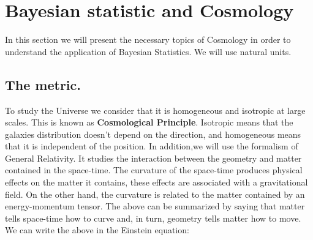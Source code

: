 \documentclass[onecolumn,           %
               showpacs,            %
               preprintnumbers,     %
               aps,                 %
               prl,          	    %
               letterpaper,             %
               superscriptaddress,      %
               nofootinbib,         %
               tightenlines,        %
               floats,floatfix      %
               ,usenatbib,
               ]{revtex4-1}
\begin{document}
\section{Bayesian statistic and Cosmology}



In this section we will present the necessary topics of Cosmology in order to understand the application of Bayesian Statistics. We will use natural units.

\subsection{The metric.}
To study the Universe we consider that it is homogeneous and isotropic at large scales. This is known as \textbf{Cosmological Principle}. Isotropic means that the galaxies distribution doesn't depend on the direction, and homogeneous means that it is independent of the position. In addition,we will use the formalism of General Relativity. It studies the interaction between the geometry and matter contained in the space-time. The curvature of the space-time produces physical effects on the matter it contains, these effects are associated with a gravitational field. On the other hand, the curvature is related to the matter contained by an energy-momentum tensor. The above can be summarized by saying that matter tells space-time how to curve and, in turn, geometry tells matter how to move. We can write the above in the Einstein equation:
\end{document}
